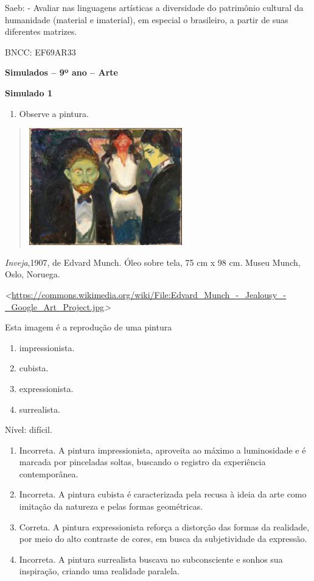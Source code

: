 \begin{escolha}
{{{{{{{{Saeb: - Avaliar nas linguagens artísticas a diversidade do patrimônio
cultural da humanidade (material e imaterial), em especial o brasileiro,
a partir de suas diferentes matrizes.

BNCC: EF69AR33

\textbf{Simulados -- 9º ano -- Arte}

\textbf{Simulado 1}

\begin{enumerate}
\def\labelenumi{\arabic{enumi}.}
\item
  Observe a pintura.
\end{enumerate}

\begin{quote}
\includegraphics[width=2.62500in,height=2.00000in]{media/image27.jpeg}
\end{quote}

\emph{Inveja},1907, de Edvard Munch. Óleo sobre tela, 75 cm x 98 cm.
Museu Munch, Oslo, Noruega.

\emph{\textless{}}\url{https://commons.wikimedia.org/wiki/File:Edvard_Munch_-_Jealousy_-_Google_Art_Project.jpg}\emph{\textgreater{}}

Esta imagem é a reprodução de uma pintura

\begin{enumerate}
\def\labelenumi{\alph{enumi})}
\item
  impressionista.
\item
  cubista.
\item
  expressionista.
\item
  surrealista.
\end{enumerate}

Nível: difícil.

\begin{enumerate}
\def\labelenumi{\alph{enumi})}
\item
  Incorreta. A pintura impressionista, aproveita ao máximo a
  luminosidade e é marcada por pinceladas soltas, buscando o registro da
  experiência contemporânea.
\item
  Incorreta. A pintura cubista é caracterizada pela recusa à ideia da
  arte como imitação da natureza e pelas formas geométricas.
\item
  Correta. A pintura expressionista reforça a distorção das formas da
  realidade, por meio do alto contraste de cores, em busca da
  subjetividade da expressão.
\item
  Incorreta. A pintura surrealista buscava no subconsciente e sonhos sua
  inspiração, criando uma realidade paralela.
\end{enumerate}

}}}}}}}}
\end{escolha}
